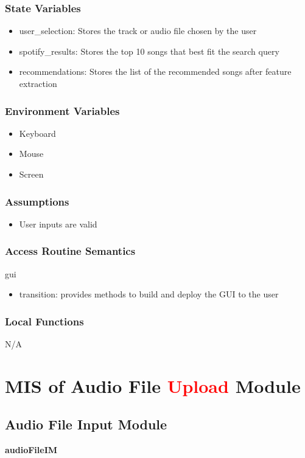 \documentclass[12pt, titlepage]{article}
\begin{document}
\subsubsection{State Variables}
\begin{itemize}
  \item user\_selection: Stores the track or audio file chosen by the user
  \item spotify\_results: Stores the top 10 songs that best fit the search query
  \item recommendations: Stores the list of the recommended songs after feature extraction
\end{itemize}

\subsubsection{Environment Variables}
\begin{itemize}
  \item Keyboard
  \item Mouse
  \item Screen
\end{itemize}

\subsubsection{Assumptions}
\begin{itemize}
  \item User inputs are valid
\end{itemize}

\subsubsection{Access Routine Semantics}
\noindent gui
\begin{itemize}
  \item transition: provides methods to build and deploy the GUI to the user
\end{itemize}
\subsubsection{Local Functions}
N/A

\section{MIS of Audio File \textcolor{red}{Upload} Module} 

\subsection{Audio File Input Module}
\textbf{audioFileIM}
\end{document}
